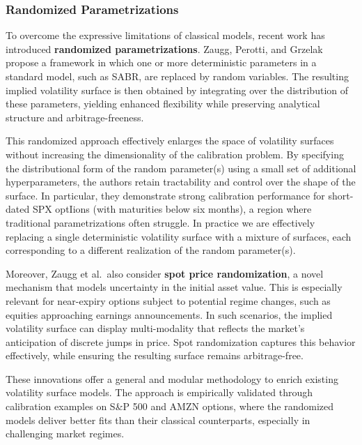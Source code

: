\subsubsection{Randomized Parametrizations}

To overcome the expressive limitations of classical models, recent work has introduced \textbf{randomized parametrizations}.
Zaugg, Perotti, and Grzelak~\cite{zaugg2024volatility} propose a framework in which one or more deterministic parameters in a standard model, such as SABR, are replaced by random variables.
The resulting implied volatility surface is then obtained by integrating over the distribution of these parameters, yielding enhanced flexibility while preserving analytical structure and arbitrage-freeness.

This randomized approach effectively enlarges the space of volatility surfaces without increasing the dimensionality of the calibration problem.
By specifying the distributional form of the random parameter(s) using a small set of additional hyperparameters, the authors retain tractability and control over the shape of the surface.
In particular, they demonstrate strong calibration performance for short-dated SPX optIions (with maturities below six months), a region where traditional parametrizations often struggle.
In practice we are effectively replacing a single deterministic volatility surface with a mixture of surfaces, each corresponding to a different realization of the random parameter(s).

Moreover, Zaugg et al.\ also consider \textbf{spot price randomization}, a novel mechanism that models uncertainty in the initial asset value.
This is especially relevant for near-expiry options subject to potential regime changes, such as equities approaching earnings announcements.
In such scenarios, the implied volatility surface can display multi-modality that reflects the market's anticipation of discrete jumps in price.
Spot randomization captures this behavior effectively, while ensuring the resulting surface remains arbitrage-free.

These innovations offer a general and modular methodology to enrich existing volatility surface models.
The approach is empirically validated through calibration examples on S\&P 500 and AMZN options, where the randomized models deliver better fits than their classical counterparts, especially in challenging market regimes.
